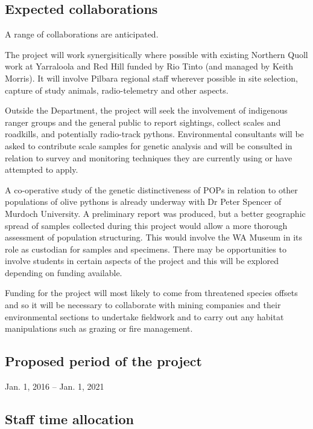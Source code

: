 \documentclass[version=last,
    paper=a4,                               %
    10pt,                                   %
    dvipsnames,
    oneside,                              %
    headings=openany,                       %
    open=any,
    BCOR=7mm,                               %
    DIV=15,     %
]{scrbook}
\begin{document}
\subsection*{Expected collaborations}

A range of collaborations are anticipated.

The project will work synergisitically where possible with existing
Northern Quoll work at Yarraloola and Red Hill funded by Rio Tinto (and
managed by Keith Morris). It will involve Pilbara regional staff
wherever possible in site selection, capture of study animals,
radio-telemetry and other aspects.

Outside the Department, the project will seek the involvement of
indigenous ranger groups and the general public to report sightings,
collect scales and roadkills, and potentially radio-track pythons.
Environmental consultants will be asked to contribute scale samples for
genetic analysis and will be consulted in relation to survey and
monitoring techniques they are currently using or have attempted to
apply.

A co-operative study of the genetic distinctiveness of POPs in relation
to other populations of olive pythons is already underway with Dr Peter
Spencer of Murdoch University. A preliminary report was produced, but a
better geographic spread of samples collected during this project would
allow a more thorough assessment of population structuring. This would
involve the WA Museum in its role as custodian for samples and
specimens. There may be opportunities to involve students in certain
aspects of the project and this will be explored depending on funding
available.

Funding for the project will most likely to come from threatened species
offsets and so it will be necessary to collaborate with mining companies
and their environmental sections to undertake fieldwork and to carry out
any habitat manipulations such as grazing or fire management.~


\subsection*{Proposed period of the project}
Jan. 1, 2016 -- Jan. 1, 2021



\subsection*{Staff time allocation }
\end{document}
